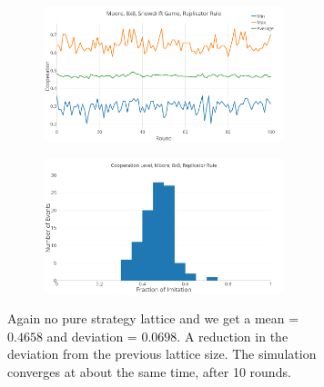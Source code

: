 \documentclass[a4paper, 11pt]{article}
\begin{document}
\begin{figure}[H]
\begin{subfigure}{.55\textwidth}
	\begin{subfigure}{1\textwidth}
		\includegraphics[width=1\linewidth]{SDMoore8x8}
	\end{subfigure}

	\begin{subfigure}{1\textwidth}
		\includegraphics[width=1\linewidth]{SDMoore8x8HG}
	\end{subfigure}
\end{subfigure}%
\begin{subfigure}{.45\textwidth}
	Again no pure strategy lattice and we get a mean = $0.4658$ and deviation = $0.0698$. A reduction in the deviation from the previous lattice size. The simulation converges at about the same time, after 10 rounds.
\end{subfigure}

\end{figure}



\newpage
\end{document}
